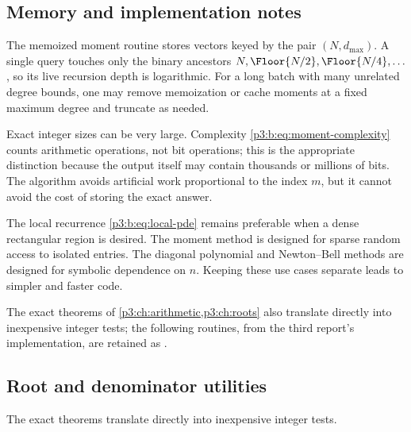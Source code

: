\documentclass[11pt,oneside]{article}
\numberwithin{equation}{section}
\theoremstyle{definition}
\theoremstyle{remark}
\begin{document}
\subsection{Memory and implementation notes}

The memoized moment routine stores vectors keyed by the pair
$(N,d_{\max})$.  A single query touches only the binary ancestors
$N,\Floor{N/2},\Floor{N/4},\ldots$, so its live recursion
depth is logarithmic.  For a long batch with many unrelated degree bounds,
one may remove memoization or cache moments at a fixed maximum degree and
truncate as needed.

Exact integer sizes can be very large.  Complexity
\eqref{p3:b:eq:moment-complexity} counts arithmetic operations, not bit
operations; this is the appropriate distinction because the output itself
may contain thousands or millions of bits.  The algorithm avoids artificial
work proportional to the index $m$, but it cannot avoid the cost of storing
the exact answer.

The local recurrence \eqref{p3:b:eq:local-pde} remains preferable when a dense
rectangular region is desired.  The moment method is designed for sparse
random access to isolated entries.  The diagonal polynomial and Newton--Bell
methods are designed for symbolic dependence on $n$.  Keeping these use cases
separate leads to simpler and faster code.

The exact theorems of \cref{p3:ch:arithmetic,p3:ch:roots} also translate directly
into inexpensive integer tests; the following routines, from the third
report's implementation, are retained as
.

\subsection{Root and denominator utilities}

The exact theorems translate directly into inexpensive integer tests.
\end{document}
